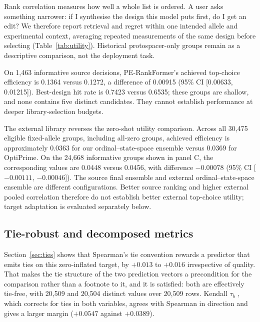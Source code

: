 \documentclass[11pt]{article}
\begin{document}
Rank correlation measures how well a whole list is ordered. A user asks something
narrower: if I synthesise the design this model puts first, do I get an edit? We
therefore report retrieval and regret within one intended allele and experimental
context, averaging repeated measurements of the same design before selecting
(Table~\ref{tab:utility}). Historical protospacer-only groups remain as a
descriptive comparison, not the deployment task.

On 1{,}463 informative source decisions, PE-RankFormer's achieved top-choice
efficiency is 0.1364 versus 0.1272, a difference of 0.00915
(95\% CI [0.00633, 0.01215]). Best-design hit rate is 0.7423 versus 0.6535;
these groups are shallow, and none contains five distinct candidates. They cannot
establish performance at deeper library-selection budgets.

The external library reverses the zero-shot utility comparison. Across all
30{,}475 eligible fixed-allele groups, including all-zero groups, achieved
efficiency is approximately 0.0363 for our ordinal--state-space ensemble versus
0.0369 for OptiPrime. On the 24{,}668 informative groups shown in panel C,
the corresponding values are 0.0448 versus 0.0456, with difference $-0.00078$
(95\% CI [$-0.00111$, $-0.00046$]). The source final ensemble and external
ordinal--state-space ensemble are different configurations. Better source ranking
and higher external pooled correlation therefore do not establish better external
top-choice utility; target adaptation is evaluated separately below.





\subsection{Tie-robust and decomposed metrics}
\label{sec:tierobust}

Section~\ref{sec:ties} shows that Spearman's tie convention rewards a predictor that
emits ties on this zero-inflated target, by $+0.013$ to $+0.016$ irrespective of quality.
That makes the tie structure of the two prediction vectors a precondition for the
comparison rather than a footnote to it, and it is satisfied: both are effectively
tie-free, with 20{,}509 and 20{,}504 distinct values over 20{,}509 rows.
Kendall $\tau_b$ \citep{kendall1945}, which corrects for ties in both variables, agrees
with Spearman in direction and gives a larger margin ($+0.0547$ against $+0.0389$).
\end{document}
